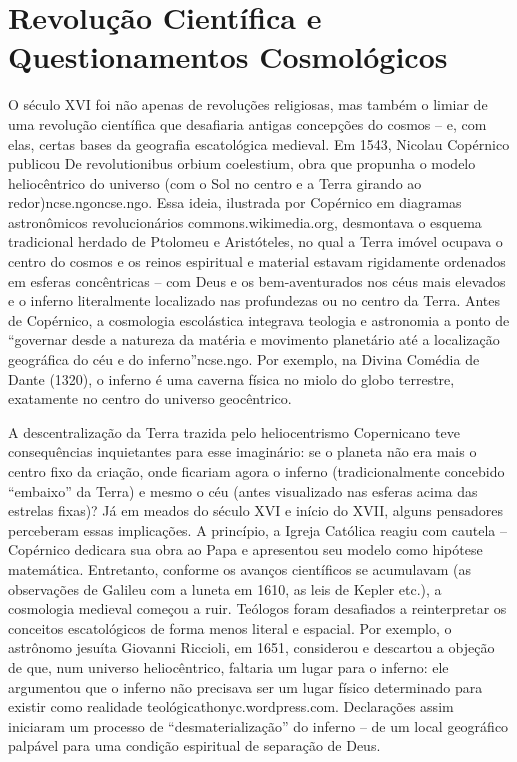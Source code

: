 \section{Revolução Científica e Questionamentos Cosmológicos}

O século XVI foi não apenas de revoluções religiosas, mas também o limiar de uma revolução científica que desafiaria antigas concepções do cosmos -- e, com elas, certas bases da geografia escatológica medieval. Em 1543, Nicolau Copérnico publicou De revolutionibus orbium coelestium, obra que propunha o modelo heliocêntrico do universo (com o Sol no centro e a Terra girando ao redor)ncse.ngoncse.ngo. Essa ideia, ilustrada por Copérnico em diagramas astronômicos revolucionários commons.wikimedia.org, desmontava o esquema tradicional herdado de Ptolomeu e Aristóteles, no qual a Terra imóvel ocupava o centro do cosmos e os reinos espiritual e material estavam rigidamente ordenados em esferas concêntricas -- com Deus e os bem-aventurados nos céus mais elevados e o inferno literalmente localizado nas profundezas ou no centro da Terra. Antes de Copérnico, a cosmologia escolástica integrava teologia e astronomia a ponto de “governar desde a natureza da matéria e movimento planetário até a localização geográfica do céu e do inferno”ncse.ngo. Por exemplo, na Divina Comédia de Dante (1320), o inferno é uma caverna física no miolo do globo terrestre, exatamente no centro do universo geocêntrico.

A descentralização da Terra trazida pelo heliocentrismo Copernicano teve consequências inquietantes para esse imaginário: se o planeta não era mais o centro fixo da criação, onde ficariam agora o inferno (tradicionalmente concebido “embaixo” da Terra) e mesmo o céu (antes visualizado nas esferas acima das estrelas fixas)? Já em meados do século XVI e início do XVII, alguns pensadores perceberam essas implicações. A princípio, a Igreja Católica reagiu com cautela -- Copérnico dedicara sua obra ao Papa e apresentou seu modelo como hipótese matemática. Entretanto, conforme os avanços científicos se acumulavam (as observações de Galileu com a luneta em 1610, as leis de Kepler etc.), a cosmologia medieval começou a ruir. Teólogos foram desafiados a reinterpretar os conceitos escatológicos de forma menos literal e espacial. Por exemplo, o astrônomo jesuíta Giovanni Riccioli, em 1651, considerou e descartou a objeção de que, num universo heliocêntrico, faltaria um lugar para o inferno: ele argumentou que o inferno não precisava ser um lugar físico determinado para existir como realidade teológicathonyc.wordpress.com. Declarações assim iniciaram um processo de “desmaterialização” do inferno -- de um local geográfico palpável para uma condição espiritual de separação de Deus.

